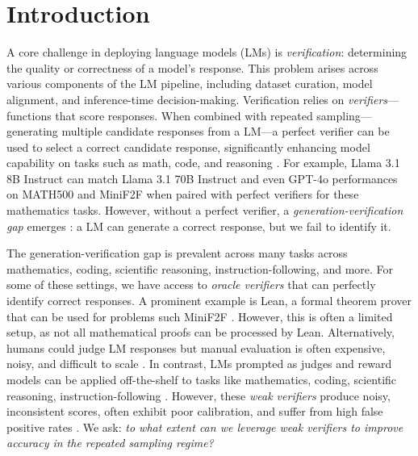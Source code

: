 
\section{Introduction}
\label{sec:introduction}

A core challenge in deploying language models (LMs) is \textit{verification}: determining the quality or correctness of a model's response. 
This problem arises across various components of the LM  pipeline, including dataset curation, model alignment, and inference-time decision-making.  
Verification relies on \textit{verifiers}—functions that score responses. 
When combined with repeated sampling---generating multiple candidate responses from a LM---a perfect verifier can be used to select a correct candidate response, significantly enhancing model capability on tasks such as math, code, and reasoning \citep{snell2024scalingllmtesttimecompute, brown2024largelanguagemonkeysscaling, puri2025probabilisticinferenceapproachinferencetime}. 
For example, Llama 3.1 8B Instruct can match Llama 3.1 70B Instruct and even GPT-4o performances on MATH500 \citep{hendrycks2021measuring} and MiniF2F \citep{zheng2022minif2fcrosssystembenchmarkformal} when paired with perfect verifiers for these mathematics tasks.  
However, without a perfect verifier, a \textit{generation-verification gap} emerges \citep{song2025mindgapexaminingselfimprovement}: a LM can generate a correct response, but we fail to identify it. 

The generation-verification gap is prevalent across many tasks across mathematics, coding, scientific reasoning, instruction-following, and more.
For some of these settings, we have access to \textit{oracle verifiers} that can perfectly identify correct responses. A prominent example is Lean, a formal theorem prover that can be used for problems such MiniF2F \citep{zheng2022minif2fcrosssystembenchmarkformal}. However, this is often a limited setup, as not all mathematical proofs can be processed by Lean. 
Alternatively, humans could judge LM responses but manual evaluation is often expensive, noisy, and difficult to scale \citep{hosking2024humanfeedbackgoldstandard, clark2021thatshumangoldevaluating, karpinska2021perilsusingmechanicalturk}.
In contrast, LMs prompted as judges \citep{chiang2024chatbot} and reward models \citep{lambert2024rewardbenchevaluatingrewardmodels, singhi2025solveverifycomputeoptimalproblem, liu20251bllmsurpass405b} can be applied off-the-shelf to tasks like mathematics, coding, scientific reasoning, instruction-following \citep{hendrycks2021measuring, rein2024gpqa, jain2024livecodebenchholisticcontaminationfree, alpaca_eval}. 
However, these \textit{weak verifiers} produce noisy, inconsistent scores, often exhibit poor calibration, and suffer from high false positive rates \citep{stroebl2024inferencescalingflawslimits}. 
We ask: \textit{to what extent can we leverage weak verifiers to improve accuracy in the repeated sampling regime?}

